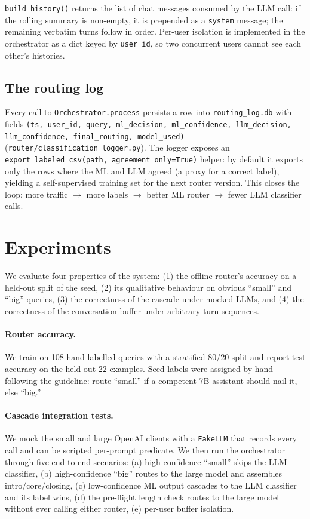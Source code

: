 \documentclass{article}
\begin{document}
\texttt{build\_history()} returns the list of chat messages consumed by the
LLM call: if the rolling summary is non-empty, it is prepended as a
\texttt{system} message; the remaining verbatim turns follow in order.
Per-user isolation is implemented in the orchestrator as a dict keyed by
\texttt{user\_id}, so two concurrent users cannot see each other's histories.

\subsection{The routing log}
\label{sec:log}

Every call to \texttt{Orchestrator.process} persists a row into
\texttt{routing\_log.db} with fields \texttt{(ts, user\_id, query, ml\_decision,
ml\_confidence, llm\_decision, llm\_confidence, final\_routing, model\_used)}
(\texttt{router/classification\_logger.py}). The logger exposes an
\texttt{export\_labeled\_csv(path, agreement\_only=True)} helper: by default
it exports only the rows where the ML and LLM agreed (a proxy for a correct
label), yielding a self-supervised training set for the next router
version. This closes the loop: more traffic $\rightarrow$ more labels
$\rightarrow$ better ML router $\rightarrow$ fewer LLM classifier calls.

\section{Experiments}
\label{sec:experiments}

We evaluate four properties of the system: (1) the offline router's accuracy
on a held-out split of the seed, (2) its qualitative behaviour on obvious
``small'' and ``big'' queries, (3) the correctness of the cascade under
mocked LLMs, and (4) the correctness of the conversation buffer under
arbitrary turn sequences.

\paragraph{Router accuracy.} We train on 108 hand-labelled queries with a
stratified 80/20 split and report test accuracy on the held-out 22 examples.
Seed labels were assigned by hand following the guideline: route ``small'' if
a competent 7B assistant should nail it, else ``big.''

\paragraph{Cascade integration tests.} We mock the small and large OpenAI
clients with a \texttt{FakeLLM} that records every call and can be scripted
per-prompt predicate. We then run the orchestrator through five end-to-end
scenarios: (a) high-confidence ``small'' skips the LLM classifier, (b)
high-confidence ``big'' routes to the large model and assembles intro/core/closing,
(c) low-confidence ML output cascades to the LLM classifier and its label
wins, (d) the pre-flight length check routes to the large model without
ever calling either router, (e) per-user buffer isolation.
\end{document}
